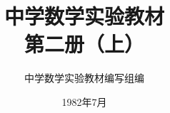 \documentclass[b5paper, openany]{ctexbook}
\theoremstyle{plain}
\begin{document}
\title{\Huge\bfseries 中学数学实验教材\\第二册（上）}



\author{\Large 中学数学实验教材编写组编}
\date{\Large 1982年7月}

\maketitle




\frontmatter


\tableofcontents


\mainmatter

 

    
    
%   
%    
%    
\end{document}
